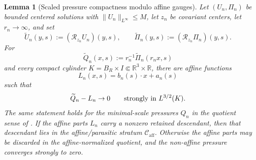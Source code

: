 \documentclass[11pt]{amsart}
\numberwithin{equation}{section}
\theoremstyle{plain}
\newtheorem{lemma}[lemma]{Lemma}
\theoremstyle{definition}
\theoremstyle{remark}
\newcommand{\calR}{\mathcal R}
\newcommand{\Caff}{\mathcal C_{\mathrm{aff}}}
\begin{document}
\begin{lemma}[Scaled pressure compactness modulo affine gauges]
\label{lem:scaled-pressure-compactness-affine}
Let \((U_n,\Pi_n)\) be bounded centered solutions with
\(\|U_n\|_{L^\infty}\le M\), let \(z_n\) be covariant centers, let
\(r_n\to\infty\), and set
\[
   \widetilde U_n(y,s):=(\calR_{z_n}U_n)(y,s),
   \qquad
   \widetilde\Pi_n(y,s):=(\calR_{z_n}\Pi_n)(y,s).
\]
For
\[
   \widetilde Q_n(x,s):=r_n^{-1}\widetilde\Pi_n(r_nx,s)
\]
and every compact cylinder
\(K=B_R\times I\Subset\mathbb R^3\times\mathbb R\), there are affine functions
\[
   L_n(x,s)=b_n(s)\cdot x+a_n(s)
\]
such that
\begin{equation}\label{eq:scaled-pressure-compactness-affine}
   \widetilde Q_n-L_n\to0
   \qquad\hbox{strongly in }L^{3/2}(K).
\end{equation}
The same statement holds for the minimal-scale pressures \(Q_n\) in the quotient
sense of .  If the affine parts
\(L_n\) carry a nonzero retained descendant, then that descendant lies in the
affine/parasitic stratum \(\Caff\).  Otherwise the affine parts may be
discarded in the affine-normalized quotient, and the non-affine pressure
converges strongly to zero.
\end{lemma}
\end{document}
